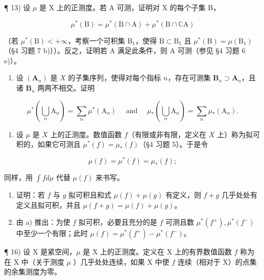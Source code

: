 ¶ 13) 设 \(\mu\) 是 X 上的正测度。若 A 可测，证明对 X 的每个子集 B，

\[
\mu^ {*} (\mathrm{B}) = \mu^ {*} (\mathrm{B} \cap \mathrm{A}) + \mu^ {*} (\mathrm{B} \cap \mathbb {C} \mathrm{A})
\]

（若 \(\mu^{*}(\mathrm{B}) < +\infty\)，考察一个可积集 \(\mathrm{B}_{1}\)，使得 \(\mathrm{B} \subset \mathrm{B}_{1}\) 且 \(\mu^{*}(\mathrm{B}) = \mu(\mathrm{B}_{1})\)（§4 习题 7 b)））。反之，证明若 A 满足此条件，则 A 可测（参见 §4 习题 6 e)）。

\begin{enumerate}
\def\labelenumi{\arabic{enumi})}
\setcounter{enumi}{13}
\tightlist
\item
  设 \((\mathbf{A}_n)\) 是 \(X\) 的子集序列，使得对每个指标 \(n\)，存在可测集 \(\mathbf{B}_n \supset \mathbf{A}_n\)，且诸 \(\mathbf{B}_n\) 两两不相交。证明
\end{enumerate}

\[
\mu^ {*} \left(\bigcup_ {n} \mathrm{A} _ {n}\right) = \sum_ {n} \mu^ {*} (\mathrm{A} _ {n}) \quad \text { and } \quad \mu_ {*} \left(\bigcup_ {n} \mathrm{A} _ {n}\right) = \sum_ {n} \mu_ {*} (\mathrm{A} _ {n}).
\]

\begin{enumerate}
\def\labelenumi{\arabic{enumi})}
\setcounter{enumi}{14}
\tightlist
\item
  设 \(\mu\) 是 \(X\) 上的正测度。数值函数 \(f\)（有限或非有限，定义在 \(X\) 上）称为拟可积的，如果它可测且 \(\mu^{*}(f) = \mu_{*}(f)\)（§4 习题 5）。于是令
\end{enumerate}

\[
\mu (f) = \mu^ {*} (f) = \mu_ {*} (f);
\]

同样，用 \(\int f d\mu\) 代替 \(\mu(f)\) 来书写。

\begin{enumerate}
\def\labelenumi{\alph{enumi})}
\item
  证明：若 \(f\) 与 \(g\) 拟可积且和式 \(\mu(f) + \mu(g)\) 有定义，则 \(f + g\) 几乎处处有定义且拟可积，并且 \(\mu(f + g) = \mu(f) + \mu(g)\)。
\item
  由 a) 推出：为使 \(f\) 拟可积，必要且充分的是 \(f\) 可测且数 \(\mu^{*}(f^{+}), \mu^{*}(f^{-})\) 中至少一个有限；此时 \(\mu(f) = \mu^{*}(f^{+}) - \mu^{*}(f^{-})\)。
\end{enumerate}

¶ 16) 设 X 是紧空间，\(\mu\) 是 X 上的正测度。定义在 X 上的有界数值函数 \(f\) 称为在 X 中（关于测度 \(\mu\) ）几乎处处连续，如果 X 中使 \(f\) 连续（相对于 X）的点集的余集测度为零。

